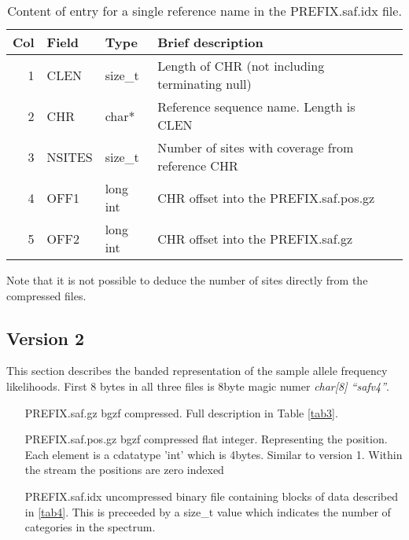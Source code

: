 \documentclass[10pt]{article}
\begin{document}
\begin{table}
\begin{tabular}{rllll}
  \hline
  {\bf Col} & {\bf Field} & {\bf Type} & {\bf Brief description} \\
  \hline
  1 & {\sf CLEN} & size\_t &  Length of CHR (not including terminating null)\\
  2 & {\sf CHR} & char* & Reference sequence name. Length is CLEN\\
  3 & {\sf NSITES} & size\_t & Number of sites with coverage from reference CHR\\
  4 & {\sf OFF1} & long int & CHR offset into the PREFIX.saf.pos.gz \\
  5 & {\sf OFF2} & long int & CHR offset into the PREFIX.saf.gz \\
  \hline
\end{tabular}\label{tab1}
\caption{Content of entry for a single reference name in the PREFIX.saf.idx file.}
\end{table}
 Note that it is not possible to deduce the number of sites directly
 from the compressed files.
\clearpage
\subsection{Version 2}
This section describes the banded representation of the sample allele frequency likelihoods.  First 8 bytes in all three files is 8byte magic numer \emph{char[8] ``safv4''}.  
\begin{itemize}
\item[PREFIX.saf.gz] bgzf compressed. Full description in Table \ref{tab3}.
\item[PREFIX.saf.pos.gz] bgzf compressed flat integer. Representing
  the position. Each element is a cdatatype 'int' which is
  4bytes. Similar to version 1. Within the stream the positions are
  zero indexed
\item[PREFIX.saf.idx] uncompressed binary file containing blocks of   data described in \ref{tab4}. This is preceeded by a size\_t value which indicates the number of categories in the spectrum.
\end{itemize}
\end{document}
